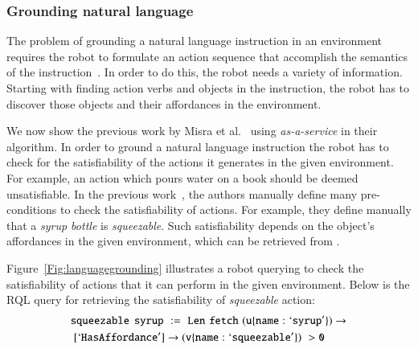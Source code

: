 
\subsubsection{Grounding natural language} The problem of grounding a natural language instruction in an environment requires the robot to formulate an action sequence  that accomplish the semantics of the  instruction~\citep{tellex2011understanding,misra2014tell,guadarrama2013grounding, MatuszekISER2012}. In order to do this, the robot needs a variety of information. Starting with finding action verbs and objects in the instruction, the robot has  to discover those objects and their affordances in the environment.


We now show the previous work by Misra et al.~\cite{misra2014tell} using \robobrain{} \textit{as-a-service} in their algorithm. In order to ground a natural language instruction the robot has to check for the satisfiability of the actions it generates in the given environment. For example, an action which pours water on a book should be deemed unsatisfiable. In the previous work~\cite{misra2014tell}, the authors manually define many pre-conditions to check the satisfiability of actions. For example, they define manually that a \textit{syrup bottle} is \textit{squeezable}. Such satisfiability  depends on the object's affordances in the given environment, which can be retrieved from \robobrain{}.

Figure~\ref{Fig:languagegrounding} illustrates a robot querying \robobrain{} to check the satisfiability of actions that it can perform in the given environment. Below is the RQL query for retrieving the satisfiability of  \textit{squeezable} action:
{\small
\begin{align*}
&{\tt {squeezable \,\ syrup}\,\,  := \,\,Len \,\,fetch \,\,(u\{name:`syrup'\})\rightarrow }\\
&{\tt \hspace*{0.1cm} [`HasAffordance']\rightarrow (v\{name:`squeezable'\})\,\,> 0}
\end{align*}
}
